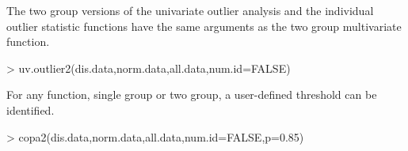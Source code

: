 \documentclass[11pt, a4paper]{article}
\begin{document}
The two group versions of the univariate outlier analysis and the individual outlier statistic functions have the same arguments as the two group multivariate function.
\begin{Schunk}
\begin{Sinput}
> uv.outlier2(dis.data,norm.data,all.data,num.id=FALSE)
\end{Sinput}
\end{Schunk}
For any function, single group or two group, a user-defined threshold can be identified.
\begin{Schunk}
\begin{Sinput}
> copa2(dis.data,norm.data,all.data,num.id=FALSE,p=0.85)
\end{Sinput}
\end{Schunk}
{}

\end{document}
